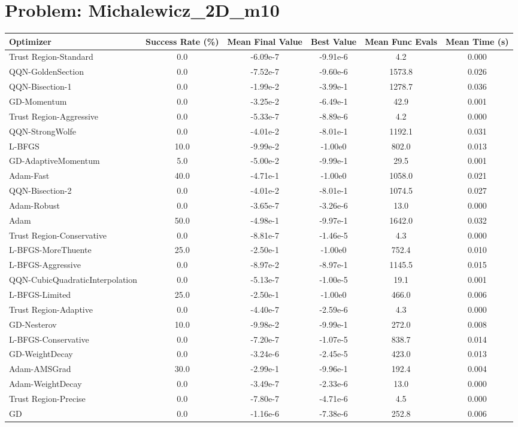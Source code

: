 \documentclass{article}
\begin{document}
\section{Problem: Michalewicz\_2D\_m10}
\begin{longtable}{p{3cm}*{5}{c}}
\toprule
\textbf{Optimizer} & \textbf{Success Rate (\%)} & \textbf{Mean Final Value} & \textbf{Best Value} & \textbf{Mean Func Evals} & \textbf{Mean Time (s)} \\
\midrule
Trust Region-Standard & 0.0 & -6.09e-7 & -9.91e-6 & 4.2 & 0.000 \\
QQN-GoldenSection & 0.0 & -7.52e-7 & -9.60e-6 & 1573.8 & 0.026 \\
QQN-Bisection-1 & 0.0 & -1.99e-2 & -3.99e-1 & 1278.7 & 0.036 \\
GD-Momentum & 0.0 & -3.25e-2 & -6.49e-1 & 42.9 & 0.001 \\
Trust Region-Aggressive & 0.0 & -5.33e-7 & -8.89e-6 & 4.2 & 0.000 \\
QQN-StrongWolfe & 0.0 & -4.01e-2 & -8.01e-1 & 1192.1 & 0.031 \\
L-BFGS & 10.0 & -9.99e-2 & -1.00e0 & 802.0 & 0.013 \\
GD-AdaptiveMomentum & 5.0 & -5.00e-2 & -9.99e-1 & 29.5 & 0.001 \\
Adam-Fast & 40.0 & -4.71e-1 & -1.00e0 & 1058.0 & 0.021 \\
QQN-Bisection-2 & 0.0 & -4.01e-2 & -8.01e-1 & 1074.5 & 0.027 \\
Adam-Robust & 0.0 & -3.65e-7 & -3.26e-6 & 13.0 & 0.000 \\
Adam & 50.0 & -4.98e-1 & -9.97e-1 & 1642.0 & 0.032 \\
Trust Region-Conservative & 0.0 & -8.81e-7 & -1.46e-5 & 4.3 & 0.000 \\
L-BFGS-MoreThuente & 25.0 & -2.50e-1 & -1.00e0 & 752.4 & 0.010 \\
L-BFGS-Aggressive & 0.0 & -8.97e-2 & -8.97e-1 & 1145.5 & 0.015 \\
QQN-CubicQuadraticInterpolation & 0.0 & -5.13e-7 & -1.00e-5 & 19.1 & 0.001 \\
L-BFGS-Limited & 25.0 & -2.50e-1 & -1.00e0 & 466.0 & 0.006 \\
Trust Region-Adaptive & 0.0 & -4.40e-7 & -2.59e-6 & 4.3 & 0.000 \\
GD-Nesterov & 10.0 & -9.98e-2 & -9.99e-1 & 272.0 & 0.008 \\
L-BFGS-Conservative & 0.0 & -7.20e-7 & -1.07e-5 & 838.7 & 0.014 \\
GD-WeightDecay & 0.0 & -3.24e-6 & -2.45e-5 & 423.0 & 0.013 \\
Adam-AMSGrad & 30.0 & -2.99e-1 & -9.96e-1 & 192.4 & 0.004 \\
Adam-WeightDecay & 0.0 & -3.49e-7 & -2.33e-6 & 13.0 & 0.000 \\
Trust Region-Precise & 0.0 & -7.80e-7 & -4.71e-6 & 4.5 & 0.000 \\
GD & 0.0 & -1.16e-6 & -7.38e-6 & 252.8 & 0.006 \\
\bottomrule
\end{longtable}
\end{document}

